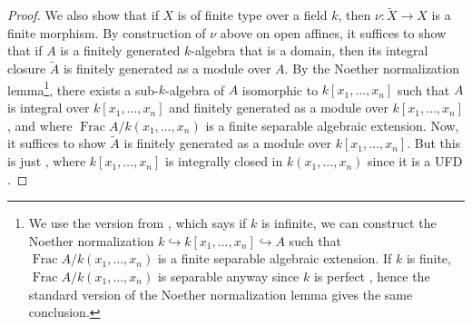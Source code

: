 \documentclass[10pt]{article}
\theoremstyle{definition}
\theoremstyle{remark}
\numberwithin{equation}{section}
\numberwithin{figure}{subsubsection}
\DeclareMathOperator{\Frac}{Frac}
\begin{document}
\begin{proof}
  \par We also show that if $X$ is of finite type over a field $k$, then
  $\nu\colon\tilde{X} \to X$ is a finite morphism. By construction of $\nu$
  above on open affines, it suffices to show that if $A$ is a finitely
  generated $k$-algebra that is a domain, then its integral closure $\tilde{A}$ is
  finitely generated as a module over $A$. By the Noether normalization
  lemma\footnote{We use the version from \cite[V, \S4, Thm.\ 8]{ZS75}, which says
  if $k$ is infinite, we can construct the Noether normalization $k
  \hookrightarrow k[x_1,\ldots,x_n] \hookrightarrow A$ such that $\Frac
  A / k(x_1,\ldots,x_n)$ is a finite separable algebraic extension. If $k$ is
  finite, $\Frac A / k(x_1,\ldots,x_n)$ is separable anyway since $k$ is
  perfect \cite[VIII, Cor.\ 4.4]{Lan02}, hence the standard version of the Noether
  normalization lemma \cite[VIII, Thm.\ 2.1]{Lan02} gives the same conclusion.},
  there exists a sub-$k$-algebra of $A$ isomorphic to
  $k[x_1,\ldots,x_n]$ such that $A$ is integral over $k[x_1,\ldots,x_n]$ and
  finitely generated as a module over $k[x_1,\ldots,x_n]$, and where $\Frac
  A / k(x_1,\ldots,x_n)$ is a finite separable algebraic extension.
  Now, it suffices to show $\tilde{A}$ is finitely generated as a module over
  $k[x_1,\ldots,x_n]$. But this is just \cite[Prop.~5.17]{AM69}, where
  $k[x_1,\ldots,x_n]$ is integrally closed in $k(x_1,\ldots,x_n)$ since it is
  a UFD \cite[VII, Prop.\ 1.7]{Lan02}.
\end{proof}
\end{document}

